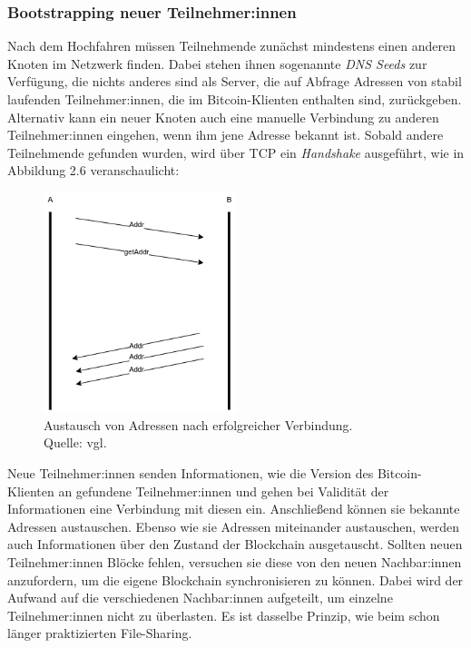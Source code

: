 \subsubsection{Bootstrapping neuer Teilnehmer:innen}
Nach dem Hochfahren müssen Teilnehmende zunächst mindestens einen anderen Knoten im Netzwerk finden. Dabei stehen ihnen sogenannte \emph{DNS Seeds} zur Verfügung, die nichts anderes sind als Server, die auf Abfrage Adressen von stabil laufenden Teilnehmer:innen, die im Bitcoin-Klienten enthalten sind, zurückgeben.
Alternativ kann ein neuer Knoten auch eine manuelle Verbindung zu anderen Teilnehmer:innen eingehen, wenn ihm jene Adresse bekannt ist.
Sobald andere Teilnehmende gefunden wurden, wird über TCP ein \emph{Handshake} ausgeführt, wie in Abbildung 2.6 veranschaulicht: 
\begin{figure}[htpb]
	\centering
	\includegraphics[width=0.5\textwidth]{images/adress_query.png}
	\caption{Austausch von Adressen nach erfolgreicher Verbindung.\\
		Quelle: vgl. \cite[S. 177]{antanopoulos_2014}}
	\label{6braun:fig:adress_query}
\end{figure}
\newpage
Neue Teilnehmer:innen senden Informationen, wie die Version des Bitcoin-Klienten an gefundene Teilnehmer:innen und gehen bei Validität der Informationen eine Verbindung mit diesen ein.
Anschließend können sie bekannte Adressen austauschen.
Ebenso wie sie Adressen miteinander austauschen, werden auch Informationen über den Zustand der Blockchain ausgetauscht. Sollten neuen Teilnehmer:innen Blöcke fehlen, versuchen sie diese von den neuen Nachbar:innen anzufordern, um die eigene Blockchain synchronisieren zu können. Dabei wird der Aufwand auf die verschiedenen Nachbar:innen aufgeteilt, um einzelne Teilnehmer:innen nicht zu überlasten. Es ist dasselbe Prinzip, wie beim schon länger praktizierten File-Sharing.
